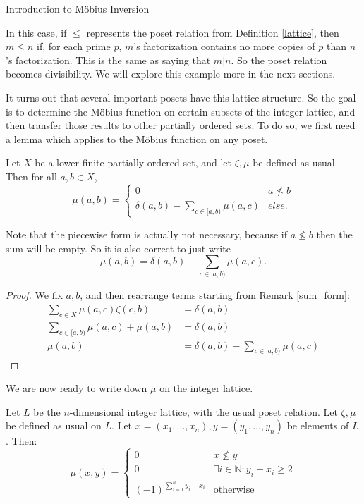 \documentclass[12pt]{pom_thesis}
\newcommand{\Nn}{\mathbb{N}}
\begin{document}
\begin{chapter}{Introduction to M\"obius Inversion}
\begin{examp}
In this case, if $\leq$ represents the poset relation from Definition \ref{lattice}, then $m \leq n$ if, for each prime $p$, $m$'s factorization contains no more copies of $p$ than $n$'s factorization. This is the same as saying that $m|n$. So the poset relation becomes divisibility. We will explore this example more in the next sections.
\end{examp}
It turns out that several important posets have this lattice structure. So the goal is to determine the M\"obius function on certain subsets of the integer lattice, and then transfer those results to other partially ordered sets. To do so, we first need a lemma which applies to the M\"obius function on any poset.
\begin{lemma}\label{recurse}
Let $X$ be a lower finite partially ordered set, and let $\zeta, \mu$ be defined as usual. Then for all $a, b \in X$,
\[
\mu(a,b) = 
\begin{cases}
0 & a \nleq b\\
\delta(a,b)-\sum_{c \in [a,b)}\mu(a,c) & else.
\end{cases}
\]
\end{lemma}
\begin{rmk}
Note that the piecewise form is actually not necessary, because if $a \nleq b$ then the sum will be empty. So it is also correct to just write
\[
\mu(a,b) = \delta(a,b)-\sum_{c \in [a,b)}\mu(a,c).
\]
\end{rmk}
\begin{proof}
We fix $a,b$, and then rearrange terms starting from Remark \ref{sum_form}:
\begin{align*}
\sum_{c \in X}\mu(a,c) \zeta(c,b) &= \delta(a,b)\\
\sum_{c \in [a,b)} \mu(a,c) + \mu(a,b) &= \delta(a,b)\\
\mu(a,b) &= \delta(a,b) - \sum_{c \in [a,b)} \mu(a,c) 
\end{align*}
\end{proof}
We are now ready to write down $\mu$ on the integer lattice.
\begin{thm}\label{int_lattice}
Let $L$ be the $n$-dimensional integer lattice, with the usual poset relation. Let $\zeta, \mu$ be defined as usual on $L$. Let $x=(x_1,\dots,x_n),y = (y_1,\dots,y_n)$ be elements of $L$. Then:
\[
\mu(x,y) =
\begin{cases}
0 & x\nleq y\\
0 & \exists i \in \Nn: y_i-x_i \geq 2\\
(-1)^{\sum_{i=1}^ny_i-x_i} & \text{otherwise}
\end{cases}
\]
\end{thm}


\end{chapter}
\end{document}
